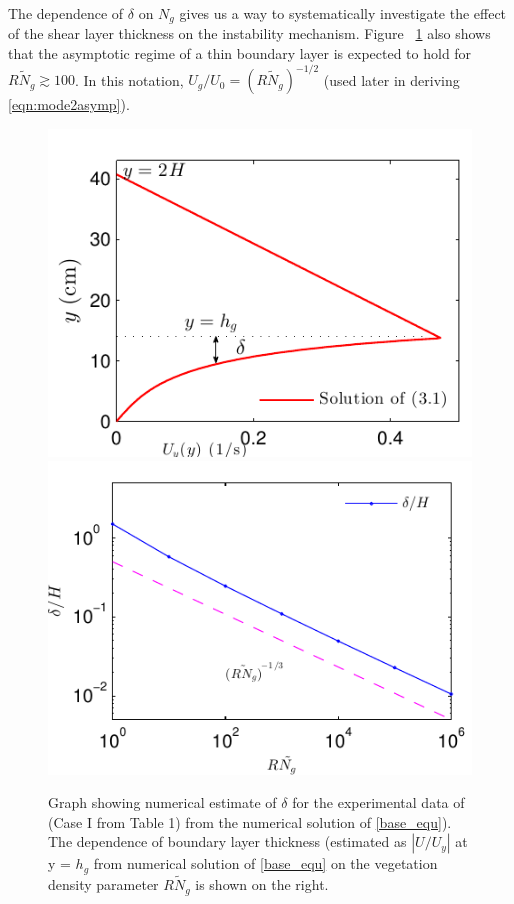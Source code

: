 \documentclass[12pt]{report}   %
\newcommand{\Rey}{{R}}
\newcommand{\Ndg}{\tilde{N}_g}
\newcommand{\ReyNdg}{{\Rey\Ndg}}
\begin{document}
The dependence of $\delta$ on $N_g$ gives us a way to systematically investigate the effect of the shear layer thickness on the instability mechanism.
Figure ~\ref{Uy_base} also shows that the asymptotic regime of a thin boundary layer is expected to hold for $\ReyNdg \gtrsim 100$. 
In this notation, $U_g/U_0 = (\Rey \Ndg)^{-1/2}$ (used later in deriving \eqref{eqn:mode2asymp}). 
\begin{figure}
\centerline{\includegraphics[scale=1.]{Grass_Base_Nepf_shear_scale} \includegraphics[scale=1.]{Grass_shear_scale}}
\caption{Graph showing numerical estimate of $\delta$ for the experimental data of \cite{Nepf04} (Case I from Table 1) from the numerical solution of \eqref{base_equ}). The dependence of boundary layer thickness (estimated as $|U/U_y|$ at y = $h_g$ from numerical solution of \ref{base_equ} on the vegetation density parameter $R\Ndg$ is shown on the right.
}
\label{Uy_base}
\end{figure}
\end{document}
